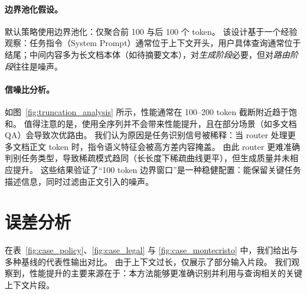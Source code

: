 \paragraph{边界池化假设。}
默认策略使用边界池化：仅聚合前 100 与后 100 个 token。
该设计基于一个经验观察：任务指令（System Prompt）通常位于上下文开头，用户具体查询通常位于结尾；中间内容多为长文档本体（如待摘要文本），对\textit{生成阶段}必要，但对\textit{路由阶段}往往是噪声。

\paragraph{信噪比分析。}
如图~\ref{fig:truncation_analysis} 所示，性能通常在 100--200 token 截断附近趋于饱和。
值得注意的是，使用全序列并不会带来性能提升，且在部分场景（如多文档 QA）会导致次优路由。
我们认为原因是任务识别信号被稀释：当 router 处理更多文档正文 token 时，指令语义特征会被高方差内容掩盖。
由此 router 更难准确判别任务类型，导致稀疏模式趋同（长长度下稀疏曲线更平），但生成质量并未相应提升。
这些结果验证了“100 token 边界窗口”是一种稳健配置：能保留关键任务描述信息，同时过滤由正文引入的噪声。

\section{误差分析}
在表~\ref{fig:case_policy}、\ref{fig:case_legal} 与 \ref{fig:case_montecristo} 中，我们给出与多种基线的代表性输出对比。
由于上下文过长，仅展示了部分输入片段。
我们观察到，性能提升的主要来源在于：本方法能够更准确识别并利用与查询相关的关键上下文片段。

\label{appdix:error_analysis}


